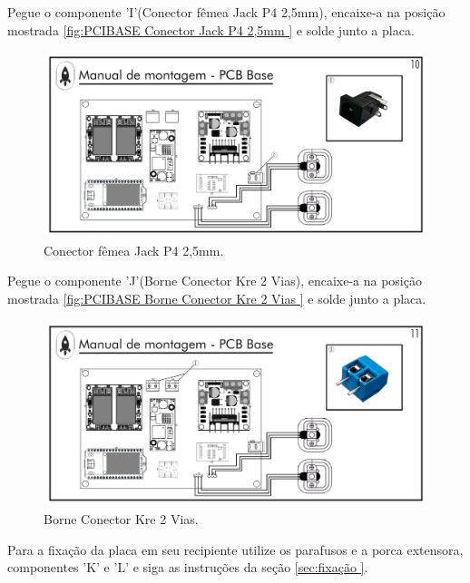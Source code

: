 \par Pegue o componente 'I'(Conector fêmea Jack P4 2,5mm), encaixe-a na posição mostrada \ref{fig:PCIBASE  Conector Jack P4 2,5mm    }   e solde junto a placa.
\begin{figure}[H]
  \centering
  \includegraphics[width=\textwidth]{Figuras/BASE/Pg-10---PL-03.png}
  \caption{ Conector fêmea Jack P4 2,5mm.}
  \label{fig:PCIBASE  Conector Jack P4 2,5mm  }
\end{figure}

\newpage
\par Pegue o componente 'J'(Borne Conector Kre 2 Vias), encaixe-a na posição mostrada \ref{fig:PCIBASE Borne Conector Kre 2 Vias }   e solde junto a placa.
\begin{figure}[H]
  \centering
  \includegraphics[width=\textwidth]{Figuras/BASE/Pg-11---PL-03.png}
  \caption{Borne Conector Kre 2 Vias.}
  \label{fig:PCIBASE Borne Conector Kre 2 Vias  }
\end{figure}

\par Para a fixação da placa em seu recipiente utilize os parafusos e a porca extensora, componentes 'K' e 'L' e siga as instruções da seção \ref{sec:fixação }.

